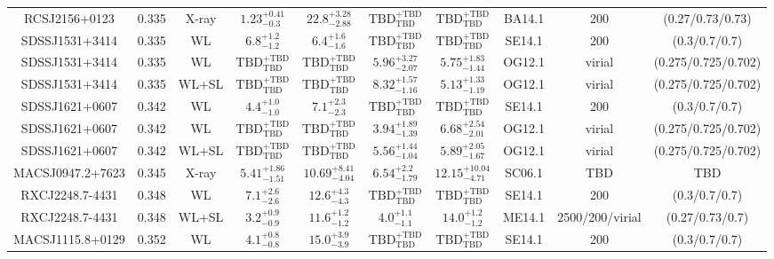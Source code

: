 \begin{table}
\begin{tabular}{cccccccccc}
RCSJ2156+0123 & 0.335 & X-ray & ${1.23}^{+0.41}_{-0.3}$ & ${22.8}^{+3.28}_{-2.88}$ & ${\mathrm{TBD}}^{+\mathrm{TBD}}_{\mathrm{TBD}}$ & ${\mathrm{TBD}}^{+\mathrm{TBD}}_{\mathrm{TBD}}$ & BA14.1 & 200 & (0.27/0.73/0.73) \\
SDSSJ1531+3414 & 0.335 & WL & ${6.8}^{+1.2}_{-1.2}$ & ${6.4}^{+1.6}_{-1.6}$ & ${\mathrm{TBD}}^{+\mathrm{TBD}}_{\mathrm{TBD}}$ & ${\mathrm{TBD}}^{+\mathrm{TBD}}_{\mathrm{TBD}}$ & SE14.1 & 200 & (0.3/0.7/0.7) \\
SDSSJ1531+3414 & 0.335 & WL & ${\mathrm{TBD}}^{+\mathrm{TBD}}_{\mathrm{TBD}}$ & ${\mathrm{TBD}}^{+\mathrm{TBD}}_{\mathrm{TBD}}$ & ${5.96}^{+3.27}_{-2.07}$ & ${5.75}^{+1.83}_{-1.44}$ & OG12.1 & virial & (0.275/0.725/0.702) \\
SDSSJ1531+3414 & 0.335 & WL+SL & ${\mathrm{TBD}}^{+\mathrm{TBD}}_{\mathrm{TBD}}$ & ${\mathrm{TBD}}^{+\mathrm{TBD}}_{\mathrm{TBD}}$ & ${8.32}^{+1.57}_{-1.16}$ & ${5.13}^{+1.33}_{-1.19}$ & OG12.1 & virial & (0.275/0.725/0.702) \\
SDSSJ1621+0607 & 0.342 & WL & ${4.4}^{+1.0}_{-1.0}$ & ${7.1}^{+2.3}_{-2.3}$ & ${\mathrm{TBD}}^{+\mathrm{TBD}}_{\mathrm{TBD}}$ & ${\mathrm{TBD}}^{+\mathrm{TBD}}_{\mathrm{TBD}}$ & SE14.1 & 200 & (0.3/0.7/0.7) \\
SDSSJ1621+0607 & 0.342 & WL & ${\mathrm{TBD}}^{+\mathrm{TBD}}_{\mathrm{TBD}}$ & ${\mathrm{TBD}}^{+\mathrm{TBD}}_{\mathrm{TBD}}$ & ${3.94}^{+1.89}_{-1.39}$ & ${6.68}^{+2.54}_{-2.01}$ & OG12.1 & virial & (0.275/0.725/0.702) \\
SDSSJ1621+0607 & 0.342 & WL+SL & ${\mathrm{TBD}}^{+\mathrm{TBD}}_{\mathrm{TBD}}$ & ${\mathrm{TBD}}^{+\mathrm{TBD}}_{\mathrm{TBD}}$ & ${5.56}^{+1.44}_{-1.04}$ & ${5.89}^{+2.05}_{-1.67}$ & OG12.1 & virial & (0.275/0.725/0.702) \\
MACSJ0947.2+7623 & 0.345 & X-ray & ${5.41}^{+1.86}_{-1.51}$ & ${10.69}^{+8.41}_{-4.04}$ & ${6.54}^{+2.2}_{-1.79}$ & ${12.15}^{+10.04}_{-4.71}$ & SC06.1 & TBD & TBD \\
RXCJ2248.7-4431 & 0.348 & WL & ${7.1}^{+2.6}_{-2.6}$ & ${12.6}^{+4.3}_{-4.3}$ & ${\mathrm{TBD}}^{+\mathrm{TBD}}_{\mathrm{TBD}}$ & ${\mathrm{TBD}}^{+\mathrm{TBD}}_{\mathrm{TBD}}$ & SE14.1 & 200 & (0.3/0.7/0.7) \\
RXCJ2248.7-4431 & 0.348 & WL+SL & ${3.2}^{+0.9}_{-0.9}$ & ${11.6}^{+1.2}_{-1.2}$ & ${4.0}^{+1.1}_{-1.1}$ & ${14.0}^{+1.2}_{-1.2}$ & ME14.1 & 2500/200/virial & (0.27/0.73/0.7) \\
MACSJ1115.8+0129 & 0.352 & WL & ${4.1}^{+0.8}_{-0.8}$ & ${15.0}^{+3.9}_{-3.9}$ & ${\mathrm{TBD}}^{+\mathrm{TBD}}_{\mathrm{TBD}}$ & ${\mathrm{TBD}}^{+\mathrm{TBD}}_{\mathrm{TBD}}$ & SE14.1 & 200 & (0.3/0.7/0.7) \\

\end{tabular}
\end{table}
